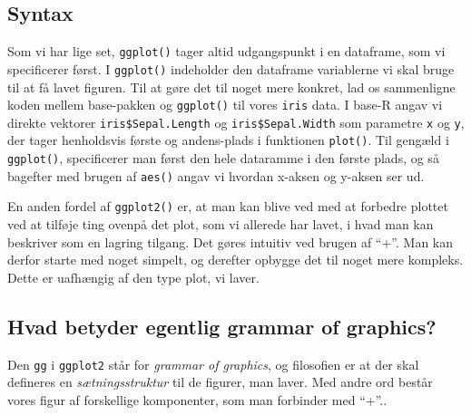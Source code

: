 \documentclass[
]{book}
\newenvironment{Shaded}{\begin{snugshade}}{\end{snugshade}}
\newcommand{\AttributeTok}[1]{\textcolor[rgb]{0.77,0.63,0.00}{#1}}
\newcommand{\CommentTok}[1]{\textcolor[rgb]{0.56,0.35,0.01}{\textit{#1}}}
\newcommand{\FunctionTok}[1]{\textcolor[rgb]{0.00,0.00,0.00}{#1}}
\newcommand{\NormalTok}[1]{#1}
\newcommand{\SpecialCharTok}[1]{\textcolor[rgb]{0.00,0.00,0.00}{#1}}
\begin{document}
\hypertarget{syntax}{%
\subsection{Syntax}\label{syntax}}

Som vi har lige set, \texttt{ggplot()} tager altid udgangspunkt i en dataframe, som vi specificerer først. I \texttt{ggplot()} indeholder den dataframe variablerne vi skal bruge til at få lavet figuren. Til at gøre det til noget mere konkret, lad os sammenligne koden mellem base-pakken og \texttt{ggplot()} til vores \texttt{iris} data. I base-R angav vi direkte vektorer \texttt{iris\$Sepal.Length} og \texttt{iris\$Sepal.Width} som parametre \texttt{x} og \texttt{y}, der tager henholdsvis første og andens-plads i funktionen \texttt{plot()}. Til gengæld i \texttt{ggplot()}, specificerer man først den hele dataramme i den første plads, og så bagefter med brugen af \texttt{aes()} angav vi hvordan x-aksen og y-aksen ser ud.

\begin{Shaded}
\end{Shaded}

En anden fordel af \texttt{ggplot2()} er, at man kan blive ved med at forbedre plottet ved at tilføje ting ovenpå det plot, som vi allerede har lavet, i hvad man kan beskriver som en lagring tilgang. Det gøres intuitiv ved brugen af ``+''. Man kan derfor starte med noget simpelt, og derefter opbygge det til noget mere kompleks. Dette er uafhængig af den type plot, vi laver.

\hypertarget{hvad-betyder-egentlig-grammar-of-graphics}{%
\subsection{Hvad betyder egentlig grammar of graphics?}\label{hvad-betyder-egentlig-grammar-of-graphics}}

Den \texttt{gg} i \texttt{ggplot2} står for \emph{grammar of graphics}, og filosofien er at der skal defineres en \emph{sætningsstruktur} til de figurer, man laver. Med andre ord består vores figur af forskellige komponenter, som man forbinder med ``+''..
\end{document}
